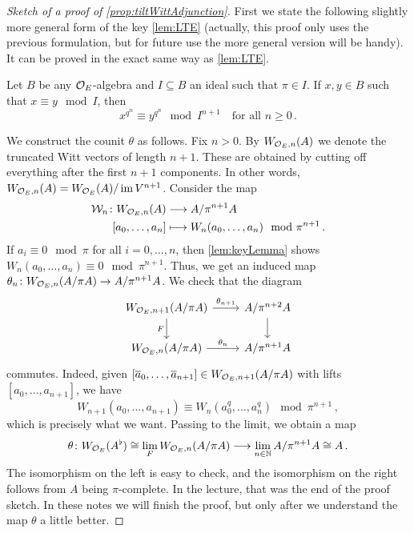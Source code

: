 \begin{proof}[Sketch of a proof of \cref{prop:tiltWittAdjunction}]
	First we state the following slightly more general form of the key \cref{lem:LTE} (actually, this proof only uses the previous formulation, but for future use the more general version will be handy). It can be proved in the exact same way as \cref{lem:LTE}.
	\begin{lem}\label{lem:keyLemma}
		Let $B$ be any $\mathcal{O}_E$-algebra and $I\subseteq B$ an ideal such that $\pi\in I$. If $x,y\in B$ such that $x\equiv y\mod I$, then
		\begin{equation*}
			x^{q^n}\equiv y^{q^n}\mod I^{n+1}\quad\text{for all }n\geq 0\,.
		\end{equation*}
	\end{lem}
	We construct the counit $\theta$ as follows. Fix $n>0$. By $W_{\mathcal{O}_E,n}(A)$ we denote the truncated Witt vectors of length $n+1$. These are obtained by cutting off everything after the first $n+1$ components. In other words, $W_{\mathcal{O}_E,n}(A)=W_{\mathcal{O}_E}(A)/\operatorname{im} V^{n+1}$. Consider the map
	\begin{align*}
		\Ww_n\colon W_{\Oo_E,n}(A)&\morphism A/\pi^{n+1}A\\
		[a_0,\dotsc,a_n]&\longmapsto W_n(a_0,\dotsc,a_n)\mod \pi^{n+1}\,.
	\end{align*}
	If $a_i\equiv 0\mod \pi$ for all $i=0,\dotsc,n$, then \cref{lem:keyLemma} shows $W_n(a_0,\dotsc,a_n)\equiv 0\mod \pi^ {n+1}$. Thus, we get an induced map $\theta_n\colon W_{\Oo_E,n}(A/\pi A)\morphism A/\pi^{n+1}A$. We check that the diagram
	\begin{equation*}
		\begin{tikzcd}
			W_{\Oo_E,n+1}(A/\pi A)\dar["F"{swap}]\rar["\theta_{n+1}"] & A/\pi^{n+2}A\dar\\
			W_{\Oo_E,n}(A/\pi A)\rar["\theta_n"] & A/\pi^{n+1}A
		\end{tikzcd}
	\end{equation*}
	commutes. Indeed, given $[\ov{a}_0,\dotsc,\ov{a}_{n+1}]\in W_{\Oo_E,n+1}(A/\pi A)$ with lifts $[a_0,\dotsc,a_{n+1}]$, we have
	\begin{equation*}
		W_{n+1}(a_0,\dotsc,a_{n+1})\equiv W_n(a_0^q,\dotsc,a_n^q)\mod \pi^{n+1}\,,
	\end{equation*}
	which is precisely what we want. Passing to the limit, we obtain a map
	\begin{equation*}
		\theta\colon W_{\Oo_E}(A^\flat)\cong \lim_FW_{\Oo_E,n}(A/\pi A)\morphism \lim_{n \in\IN}A/\pi^{n+1}A\cong A\,.
	\end{equation*}
	The isomorphism on the left is easy to check, and the isomorphism on the right follows from $A$ being $\pi$-complete. In the lecture, that was the end of the proof sketch. In these notes we will finish the proof, but only after we understand the map $\theta$ a little better.
\end{proof}
